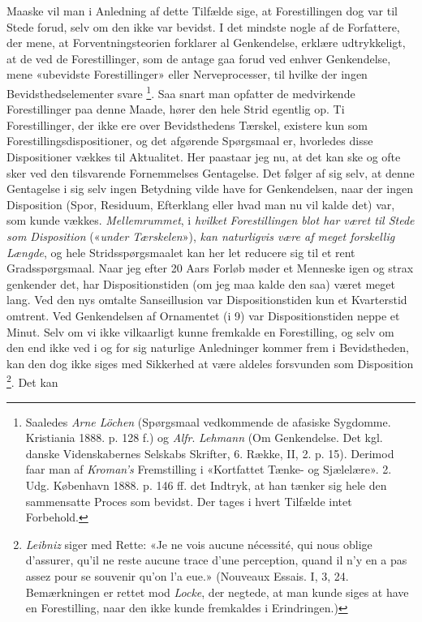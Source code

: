 \documentclass[12pt,a4paper,openany]{book}
\newcommand{\opage}[1]{\marginnote{\footnotesize\textit{[#1]}}}
\begin{document}
Maaske vil man i Anledning af dette Tilfælde sige, at Forestillingen dog var
til Stede forud, selv om den ikke var bevidst. I det mindste nogle af de
Forfattere, der mene, at Forventningsteorien forklarer al Genkendelse, erklære
udtrykkeligt, at de ved de Forestillinger, som de antage gaa forud ved enhver
Genkendelse, mene «ubevidste Forestillinger» eller Nerveprocesser, til hvilke
der ingen Bevidsthedselementer svare%
\footnote[1]{Saaledes \emph{Arne Löchen} (Spørgsmaal vedkommende de afasiske
Sygdomme. Kristiania 1888. p. 128 f.) og \emph{Alfr}. \emph{Lehmann} (Om
Genkendelse. Det kgl. danske Videnskabernes Selskabs Skrifter, 6. Række, II, 2.
p. 15). Derimod faar man af \emph{Kroman's} Fremstilling i «Kortfattet Tænke-
og Sjælelære». 2. Udg. København 1888. p. 146 ff. det Indtryk, at han tænker
sig hele den sammensatte Proces som bevidst. Der tages i hvert Tilfælde intet
Forbehold.}. Saa snart man opfatter de medvirkende Forestillinger paa denne
Maade, hører den hele Strid egentlig op. Ti Forestillinger, der ikke ere over
Bevidsthedens Tærskel, existere kun som Forestillingsdispositioner, og det
afgørende Spørgsmaal er, hvorledes disse Dispositioner vækkes til Aktualitet.
Her paastaar jeg nu, at det kan ske og ofte sker ved den tilsvarende
Fornemmelses Gentagelse. Det følger af sig selv, at denne Gentagelse i sig selv
ingen Betydning vilde have for Genkendelsen, naar der ingen Disposition (Spor,
Residuum, Efterklang eller hvad man nu vil kalde det) var, som kunde vækkes.
\emph{Mellemrummet}, i \emph{hvilket}
\setcounter{footnote}{0}%
\opage{23}\emph{Forestillingen blot har været til Stede som Disposition}
(«\emph{under Tærskelen}»), \emph{kan naturligvis være af meget forskellig
Længde}, og hele Stridsspørgsmaalet kan her let reducere sig til et rent
Gradsspørgsmaal. Naar jeg efter 20 Aars Forløb møder et Menneske igen og strax
genkender det, har Dispositionstiden (om jeg maa kalde den saa) været meget
lang. Ved den nys omtalte Sanseillusion var Dispositionstiden kun et
Kvarterstid omtrent. Ved Genkendelsen af Ornamentet (i 9) var Dispositionstiden
neppe et Minut. Selv om vi ikke vilkaarligt kunne fremkalde en Forestilling, og
selv om den end ikke ved i og for sig naturlige Anledninger kommer frem i
Bevidstheden, kan den dog ikke siges med Sikkerhed at være aldeles forsvunden
som Disposition%
\footnote[1]{\emph{Leibniz} siger med Rette: «Je ne vois aucune nécessité, qui
nous oblige d'assurer, qu'il ne reste aucune trace d'une perception, quand il
n'y en a pas assez pour se souvenir qu'on l'a eue.» (Nouveaux Essais. I, 3, 24.
Bemærkningen er rettet mod \emph{Locke}, der negtede, at man kunde siges at
have en Forestilling, naar den ikke kunde fremkaldes i Erindringen.)}. Det kan
\end{document}
